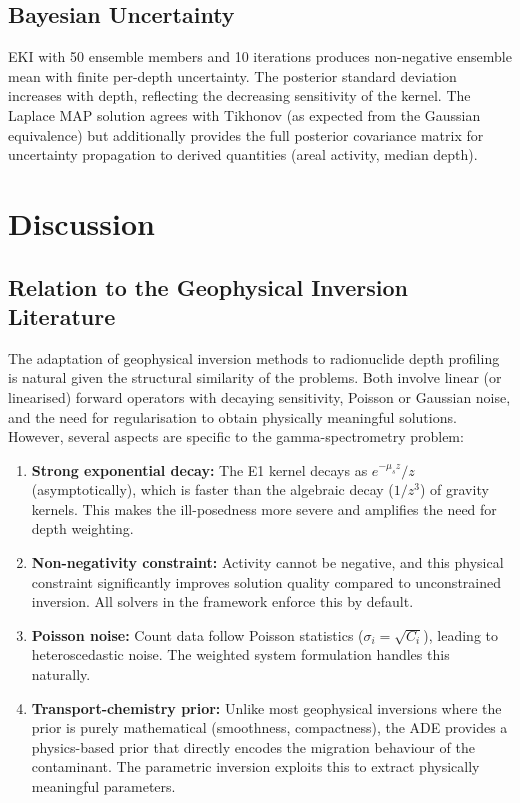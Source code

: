 \documentclass[a4paper,11pt]{article}
\begin{document}
\subsection{Bayesian Uncertainty}

EKI with 50 ensemble members and 10 iterations produces non-negative
ensemble mean with finite per-depth uncertainty.  The posterior standard
deviation increases with depth, reflecting the decreasing sensitivity of
the kernel.  The Laplace MAP solution agrees with Tikhonov (as expected
from the Gaussian equivalence) but additionally provides the full
posterior covariance matrix for uncertainty propagation to derived
quantities (areal activity, median depth).


\section{Discussion}\label{sec:discussion}

\subsection{Relation to the Geophysical Inversion Literature}

The adaptation of geophysical inversion methods to radionuclide depth
profiling is natural given the structural similarity of the problems.
Both involve linear (or linearised) forward operators with decaying
sensitivity, Poisson or Gaussian noise, and the need for
regularisation to obtain physically meaningful solutions.  However,
several aspects are specific to the gamma-spectrometry problem:

\begin{enumerate}
  \item \textbf{Strong exponential decay:} The E1 kernel decays as
  $e^{-\mu_s z}/z$ (asymptotically), which is faster than the
  algebraic decay ($1/z^3$) of gravity kernels.  This makes the
  ill-posedness more severe and amplifies the need for depth weighting.

  \item \textbf{Non-negativity constraint:} Activity cannot be negative,
  and this physical constraint significantly improves solution quality
  compared to unconstrained inversion.  All solvers in the framework
  enforce this by default.

  \item \textbf{Poisson noise:} Count data follow Poisson statistics
  ($\sigma_i = \sqrt{C_i}$), leading to heteroscedastic noise.  The
  weighted system formulation handles this naturally.

  \item \textbf{Transport-chemistry prior:} Unlike most geophysical
  inversions where the prior is purely mathematical (smoothness,
  compactness), the ADE provides a physics-based prior that directly
  encodes the migration behaviour of the contaminant.  The parametric
  inversion exploits this to extract physically meaningful parameters.
\end{enumerate}
\end{document}
